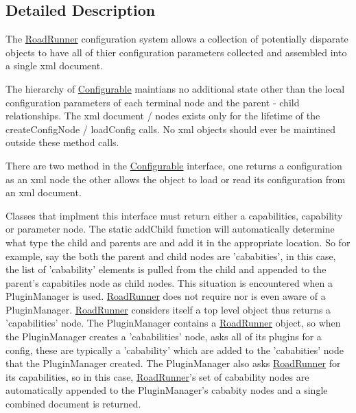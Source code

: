 \subsection{Detailed Description}
The \hyperlink{classrr_1_1_road_runner}{Road\-Runner} configuration system allows a collection of potentially disparate objects to have all of thier configuration parameters collected and assembled into a single xml document.

The hierarchy of \hyperlink{classrr_1_1_configurable}{Configurable} maintians no additional state other than the local configuration parameters of each terminal node and the parent -\/ child relationships. The xml document / nodes exists only for the lifetime of the create\-Config\-Node / load\-Config calls. No xml objects should ever be maintined outside these method calls.

There are two method in the \hyperlink{classrr_1_1_configurable}{Configurable} interface, one returns a configuration as an xml node the other allows the object to load or read its configuration from an xml document.

Classes that implment this interface must return either a capabilities, capability or parameter node. The static add\-Child function will automatically determine what type the child and parents are and add it in the appropriate location. So for example, say the both the parent and child nodes are 'cababities', in this case, the list of 'cabability' elements is pulled from the child and appended to the parent's capabitiles node as child nodes. This situation is encountered when a Plugin\-Manager is used. \hyperlink{classrr_1_1_road_runner}{Road\-Runner} does not require nor is even aware of a Plugin\-Manager. \hyperlink{classrr_1_1_road_runner}{Road\-Runner} considers itself a top level object thus returns a 'capabilities' node. The Plugin\-Manager contains a \hyperlink{classrr_1_1_road_runner}{Road\-Runner} object, so when the Plugin\-Manager creates a 'cababilities' node, asks all of its plugins for a config, these are typically a 'cabability' which are added to the 'cababities' node that the Plugin\-Manager created. The Plugin\-Manager also asks \hyperlink{classrr_1_1_road_runner}{Road\-Runner} for its capabilities, so in this case, \hyperlink{classrr_1_1_road_runner}{Road\-Runner}'s set of cabability nodes are automatically appended to the Plugin\-Manager's cababity nodes and a single combined document is returned. 

